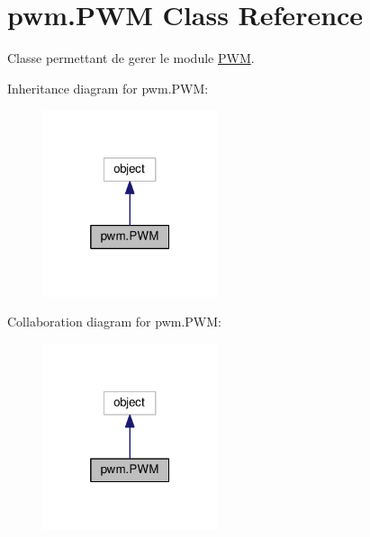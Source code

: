 \hypertarget{classpwm_1_1PWM}{}\section{pwm.\+P\+WM Class Reference}
\label{classpwm_1_1PWM}


Classe permettant de gerer le module \hyperlink{classpwm_1_1PWM}{P\+WM}.  




Inheritance diagram for pwm.\+P\+WM\+:
\nopagebreak
\begin{figure}[H]
\begin{center}
\leavevmode
\includegraphics[width=145pt]{classpwm_1_1PWM__inherit__graph}
\end{center}
\end{figure}


Collaboration diagram for pwm.\+P\+WM\+:
\nopagebreak
\begin{figure}[H]
\begin{center}
\leavevmode
\includegraphics[width=145pt]{classpwm_1_1PWM__coll__graph}
\end{center}
\end{figure}
